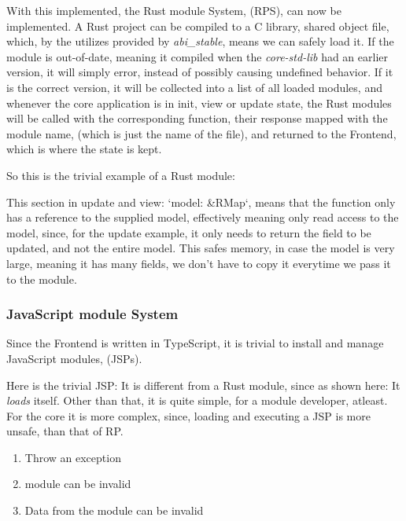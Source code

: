 \documentclass[runningheads]{llncs}
\begin{document}

With this implemented, the Rust module System, (RPS), can now be implemented.
A Rust project can be compiled to a C library, shared object file, which, by the
utilizes provided by \textit{abi_stable}, means we can safely load it. If the
module is out-of-date, meaning it compiled when the \textit{core-std-lib} had an
earlier version, it will simply error, instead of possibly causing undefined
behavior. If it is the correct version, it will be collected into a list of all
loaded modules, and whenever the core application is in init, view or update
state, the Rust modules will be called with the corresponding function, their
response mapped with the module name, (which is just the name of the file), and
returned to the Frontend, which is where the state is kept.

So this is the trivial example of a Rust module:

This section in update and view: `model: &RMap`, means that the function only
has a reference to the supplied model, effectively meaning only read access to
the model, since, for the update example, it only needs to return the field to
be updated, and not the entire model. This safes memory, in case the model is
very large, meaning it has many fields, we don't have to copy it everytime we
pass it to the module.

\subsubsection{JavaScript module System}
Since the Frontend is written in TypeScript, it is trivial to install and manage
JavaScript modules, (JSPs).

Here is the trivial JSP:
It is different from a Rust module, since as shown here:
It \textit{loads} itself. %
Other than that, it is quite simple, for a module developer, atleast. For the
core it is more complex, since, loading and executing a JSP is more unsafe, than
that of RP.

\begin{enumerate}
  \item Throw an exception
  \item module can be invalid
  \item Data from the module can be invalid
\end{enumerate}
\end{document}
